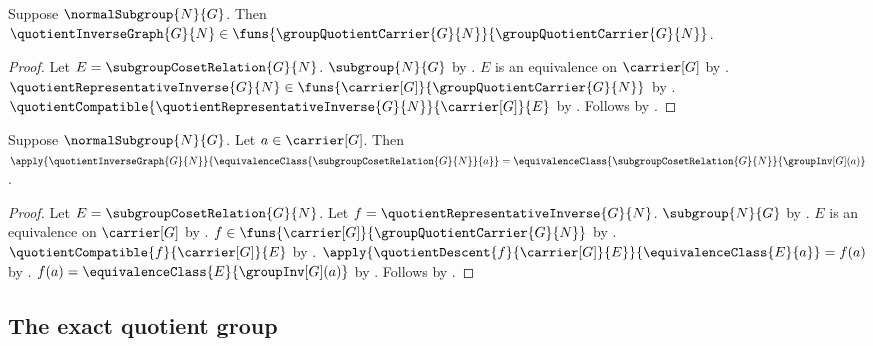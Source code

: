 \begin{proposition}\label{quotient_inverse_graph_type}
    Suppose $\normalSubgroup{N}{G}$.
    Then $\quotientInverseGraph{G}{N}\in
        \funs{
            \groupQuotientCarrier{G}{N}}
            {\groupQuotientCarrier{G}{N}}$.
\end{proposition}
\begin{proof}
    Let $E=\subgroupCosetRelation{G}{N}$.
    $\subgroup{N}{G}$ by .
    $E$ is an equivalence on $\carrier[G]$ by
        .
    $\quotientRepresentativeInverse{G}{N}\in
        \funs{\carrier[G]}{\groupQuotientCarrier{G}{N}}$ by
        .
    $\quotientCompatible
        {\quotientRepresentativeInverse{G}{N}}
        {\carrier[G]}{E}$ by
        .
    Follows by
        .
\end{proof}

\begin{proposition}\label{quotient_inverse_graph_apply}
    Suppose $\normalSubgroup{N}{G}$.
    Let $a\in\carrier[G]$.
    Then
        $\apply{\quotientInverseGraph{G}{N}}
            {\equivalenceClass{\subgroupCosetRelation{G}{N}}{a}}
        =\equivalenceClass
            {\subgroupCosetRelation{G}{N}}
            {\groupInv[G](a)}$.
\end{proposition}
\begin{proof}
    Let $E=\subgroupCosetRelation{G}{N}$.
    Let $f=\quotientRepresentativeInverse{G}{N}$.
    $\subgroup{N}{G}$ by .
    $E$ is an equivalence on $\carrier[G]$ by
        .
    $f\in\funs{\carrier[G]}{\groupQuotientCarrier{G}{N}}$ by
        .
    $\quotientCompatible{f}{\carrier[G]}{E}$ by
        .
    $\apply{\quotientDescent{f}{\carrier[G]}{E}}
        {\equivalenceClass{E}{a}}=f(a)$ by
        .
    $f(a)=\equivalenceClass{E}{\groupInv[G](a)}$ by
        .
    Follows by .
\end{proof}

\subsection{The exact quotient group}

